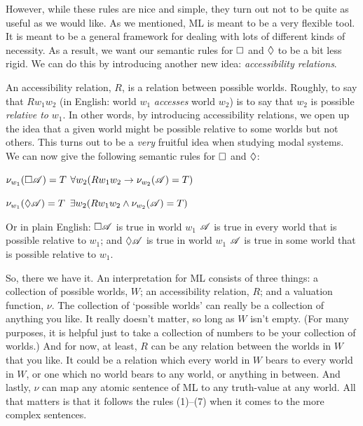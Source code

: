 However, while these rules are nice and simple, they turn out not to be quite as useful as we would like. As we mentioned, ML is meant to be a very flexible tool. It is meant to be a general framework for dealing with lots of different kinds of necessity. As a result, we want our semantic rules for $\Box$ and $\Diamond$ to be a bit less rigid. We can do this by introducing another new idea: \emph{accessibility relations}.

An accessibility relation, $R$, is a relation between possible worlds. Roughly, to say that $Rw_1w_2$ (in English: world $w_1$ \emph{accesses} world $w_2$) is to say that $w_2$ is possible \emph{relative to} $w_1$. In other words, by introducing accessibility relations, we open up the idea that a given world might be possible relative to some worlds but not others. This turns out to be a \emph{very} fruitful idea when studying modal systems. We can now give the following semantic rules for $\Box$ and $\Diamond$:
\begin{compactlist}[resume]
	\item $\nu_{w_1}(\Box \mathscr{A})=T$ \ifeff{} $\forall w_2 (Rw_1w_2\rightarrow \nu_{w_2}(\mathscr{A})=T)$
	\item $\nu_{w_1}(\Diamond \mathscr{A})=T$ \ifeff{} $\exists w_2 (Rw_1w_2\wedge \nu_{w_2}(\mathscr{A})=T)$
\end{compactlist}
Or in plain English: $\Box\mathscr{A}$ is true in world $w_1$ \ifeff{} $\mathscr{A}$ is true in every world that is possible relative to $w_1$; and $\Diamond\mathscr{A}$ is true in world $w_1$ \ifeff{} $\mathscr{A}$ is true in some world that is possible relative to $w_1$.

So, there we have it. An interpretation for ML consists of three things: a collection of possible worlds, $W$; an accessibility relation, $R$; and a valuation function, $\nu$. The collection of `possible worlds' can really be a collection of anything you like. It really doesn't matter, so long as $W$ isn't empty. (For many purposes, it is helpful just to take a collection of numbers to be your collection of worlds.) And for now, at least, $R$ can be any relation between the worlds in $W$ that you like. It could be a relation which every world in $W$ bears to every world in $W$, or one which no world bears to any world, or anything in between. And lastly, $\nu$ can map any atomic sentence of ML to any truth-value at any world. All that matters is that it follows the rules (1)--(7) when it comes to the more complex sentences.


